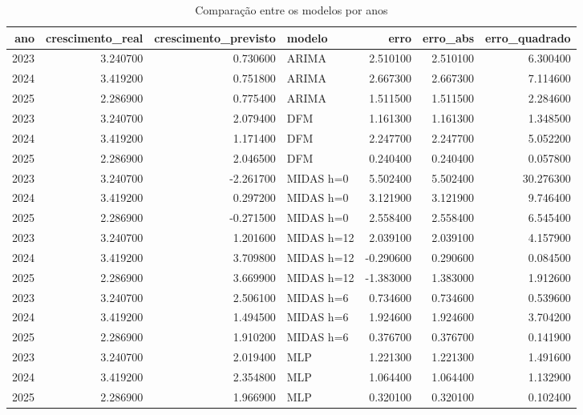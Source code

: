 \begin{table}[htbp]
	\centering
	\captionsetup{justification=centering}
	\caption{Comparação entre os modelos por anos}
	\label{tab:comparacao_modelos}
	
	\scriptsize
	\setlength{\tabcolsep}{2pt}
	\renewcommand{\arraystretch}{1.3}
	
	\begin{tabularx}{\textwidth}{rrr>{\RaggedRight\arraybackslash}Xrrr}
		\toprule
		ano & crescimento\_real & crescimento\_previsto & modelo & erro & erro\_abs & erro\_quadrado \\
		\midrule
		2023 & 3.240700 & 0.730600 & ARIMA & 2.510100 & 2.510100 & 6.300400 \\
		2024 & 3.419200 & 0.751800 & ARIMA & 2.667300 & 2.667300 & 7.114600 \\
		2025 & 2.286900 & 0.775400 & ARIMA & 1.511500 & 1.511500 & 2.284600 \\
		2023 & 3.240700 & 2.079400 & DFM & 1.161300 & 1.161300 & 1.348500 \\
		2024 & 3.419200 & 1.171400 & DFM & 2.247700 & 2.247700 & 5.052200 \\
		2025 & 2.286900 & 2.046500 & DFM & 0.240400 & 0.240400 & 0.057800 \\
		2023 & 3.240700 & -2.261700 & MIDAS h=0 & 5.502400 & 5.502400 & 30.276300 \\
		2024 & 3.419200 & 0.297200 & MIDAS h=0 & 3.121900 & 3.121900 & 9.746400 \\
		2025 & 2.286900 & -0.271500 & MIDAS h=0 & 2.558400 & 2.558400 & 6.545400 \\
		2023 & 3.240700 & 1.201600 & MIDAS h=12 & 2.039100 & 2.039100 & 4.157900 \\
		2024 & 3.419200 & 3.709800 & MIDAS h=12 & -0.290600 & 0.290600 & 0.084500 \\
		2025 & 2.286900 & 3.669900 & MIDAS h=12 & -1.383000 & 1.383000 & 1.912600 \\
		2023 & 3.240700 & 2.506100 & MIDAS h=6 & 0.734600 & 0.734600 & 0.539600 \\
		2024 & 3.419200 & 1.494500 & MIDAS h=6 & 1.924600 & 1.924600 & 3.704200 \\
		2025 & 2.286900 & 1.910200 & MIDAS h=6 & 0.376700 & 0.376700 & 0.141900 \\
		2023 & 3.240700 & 2.019400 & MLP & 1.221300 & 1.221300 & 1.491600 \\
		2024 & 3.419200 & 2.354800 & MLP & 1.064400 & 1.064400 & 1.132900 \\
		2025 & 2.286900 & 1.966900 & MLP & 0.320100 & 0.320100 & 0.102400 \\

\end{tabularx}
\end{table}
